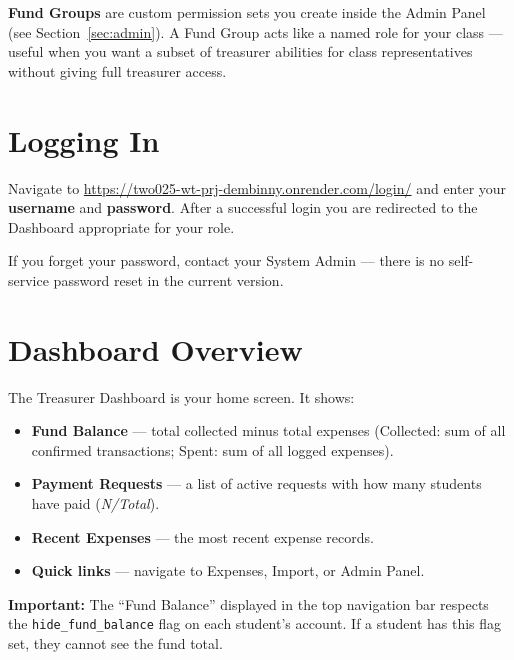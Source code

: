 \documentclass[a4paper,11pt]{article}
\begin{document}
\noindent
\textbf{Fund Groups} are custom permission sets you create inside the Admin
Panel (see Section~\ref{sec:admin}). A Fund Group acts like a named role for
your class — useful when you want a subset of treasurer abilities for class
representatives without giving full treasurer access.

\section{Logging In}

Navigate to \url{https://two025-wt-prj-dembinny.onrender.com/login/} and enter
your \textbf{username} and \textbf{password}.
After a successful login you are redirected to the Dashboard appropriate for
your role.

If you forget your password, contact your System Admin — there is no
self-service password reset in the current version.

\section{Dashboard Overview}

The Treasurer Dashboard is your home screen. It shows:

\begin{itemize}[noitemsep]
    \item \textbf{Fund Balance} — total collected minus total expenses
          (Collected: sum of all confirmed transactions;
           Spent: sum of all logged expenses).
    \item \textbf{Payment Requests} — a list of active requests with how many
          students have paid (\emph{N/Total}).
    \item \textbf{Recent Expenses} — the most recent expense records.
    \item \textbf{Quick links} — navigate to Expenses, Import, or Admin Panel.
\end{itemize}

\noindent
\textcolor{warnred}{\textbf{Important:}} The ``Fund Balance'' displayed in the
top navigation bar respects the \texttt{hide\_fund\_balance} flag on each
student's account. If a student has this flag set, they cannot see the fund
total.
\end{document}
